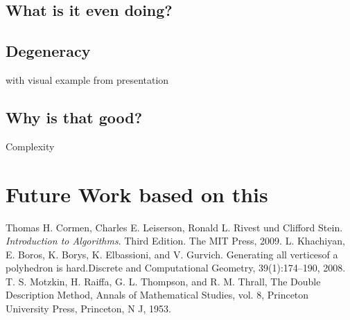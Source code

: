 \documentclass[a4paper, 11pt]{article}
\begin{document}
\subsection{What is it even doing?}
\subsection{Degeneracy}
with visual example from presentation
\subsection{Why is that good?}
Complexity

\section{Future Work based on this }

\newpage

\begin{thebibliography}{9}
	Thomas H. Cormen, Charles E. Leiserson, Ronald L. Rivest und Clifford Stein.
	\textit{Introduction to Algorithms}. Third Edition. The MIT Press, 2009.
	L. Khachiyan, E. Boros, K. Borys, K. Elbassioni, and V. Gurvich. Generating all
	verticesof a polyhedron is hard.Discrete and Computational Geometry,
	39(1):174–190, 2008.
	T. S. Motzkin, H. Raiffa, G. L. Thompson, and R. M. Thrall, The Double Description Method,
	Annals of Mathematical Studies, vol. 8, Princeton University Press, Princeton, N J, 1953.
\end{thebibliography}
\end{document}

